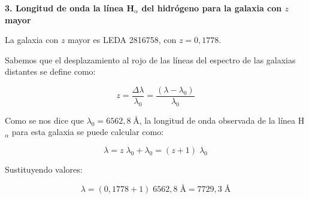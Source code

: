 \textbf{3. Longitud de onda la línea H$_{\alpha}$ del hidrógeno para la galaxia
con $z$ mayor}

\vspace{20px}

La galaxia con $z$ mayor es LEDA 2816758, con $z = 0,1778$.

Sabemos que el desplazamiento al rojo de las líneas del espectro de las galaxias distantes se define como:

\begin{equation*}
    z = \frac{\Delta \lambda}{\lambda_0} = \frac{(\lambda - \lambda_0)}{\lambda_0}
\end{equation*}

Como se nos dice que $\lambda_0 = 6562,8\;\si{\angstrom}$, la longitud de onda observada de la línea H$_{\alpha}$ para esta galaxia
se puede calcular como:

\begin{equation*}
    \lambda = z \; \lambda_0 + \lambda_0 =  (z + 1)\; \lambda_0
\end{equation*}

Sustituyendo valores:

\begin{equation*}
    \lambda =   (0,1778 + 1) \; 6562,8\;\si{\angstrom} = 7729,3 \; \si{\angstrom}
\end{equation*}
\vspace{20px}
